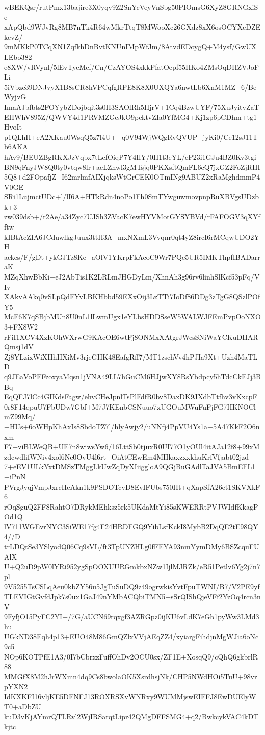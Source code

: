 wBEKQsr/rutPmx13bajire3X0yqv9Z2SnYcVeyVnSbg50PIOmsG6XyZ8GRNGxiSe
xApQbd9WJvRg8MB7nTk4R64wMkrTtqT8MWooXc26GXdz8xX6osOCYXcDZEkevZ/+
9mMKkP0TCqXN1ZqfkhDnBvtKNUnIMpWfJm/8AtvdEDoygQ+M4ysf/GwUXLEbo382
e8XW/vRVynl/5lEvTyeMcf/Cn/CzAYOS4xkkPfatOepf55HKo4ZMsOqDHZVJoFLi
5iVbzc39DNJvyX1B8sCR8hVPCqfgRPE8K8X0UXQYa6nwtLb6XnM1MZ+6/BeWyjvG
ImaAJbfbts2FOYybZDojbqit3s0H3SAOlRh5HjrV+1Cq4BzwUYF/75XuJyitvZaT
EIIWhV895Z/QWVY4d1PRVMZGcJkO9pcktvZIa0YfMG4+Kj1zp6pCDhm+tg1HvoIt
p1QLhH+eA2XKau0WsqQ5z7l4U++q0V94WjWQgRvQVUP+jyKi0/Ce12sJ11Tb6AKA
hAv9/BEUZBgRKXJzVqbx7tLefOiqP7Y4IlY/0H1t3eYL/eP23i1GJu4BZ0Kv3tgi
BN9qFnyJW8Q0ty0vtqw8lr+aeLZnwl3gMTsjq0PKXsftQmFL6cQ7jxGZ2FoZjRHI
5Q8+d2FOpafjZ+I62mrlmfAIXjqksWtGrCEK0OTmINg9ABUZ2xRaMghdmmP4V0GE
SRi1LujmctUDc+l/lI6A+HTkRdn4noPo1Fh0SmTYwguwmovpnpRuXBVgsUDzbk+3
zw039dsb+/r2Ae/a34Zyc7UJSh3ZVacK7ewHYVMotGYSYBVd/rFAFOGV3qXYfftw
kIBtAcZIA6JCduwlkgJuux3ttH3A+mxNXmL3Vvqnr0qt4yZ8ircI6rMCqwUDO2YH
ackcs/F/gDt+ykGJTz8Ke+aOlV1YKrpFkAcoC9Wr7PQe5UR5IMKThpfIBADarraK
MZqXhwBbKi+eJ2AbTis1K2LRLmJHGDyLm/XhnAh3g96rv6linhSlKcf53pFq/VIv
XAkvAAkq0vSLpQdFYvLBKHbbd59EXxOij3LzTTi7IoDf86DDg3zTgG8QSzlPOfY5
McF6K7qSBjbMUn8U0nL1lLwmUgx1eYLbsHDDSseW5WALWJFEmPvpOoNXO3+FX8W2
rFiI1XCV4XzKOhWXrwG9KAcOE6wtFj8ONMxXAtgrJWcsSNiWaYCKuDHARQmsj1dV
Zj8YLzixWiXHhHXiMv3rjeGHK48EafgRff7/MT1zschVv4hPJIa9Xt+Uzh4MaTLD
q9JEaVoPFFzoxyaMqsn1jVNA49LL7hGuCM6HJjwXY8RsYbdpcy5hTdcCkEJj3BBq
EqQFJ7lCc4GIKdsFagw/ehvCHeJpnlTsPlFdfR0bv8DaxDK9JXdbTtfhv3vKxcpF
0r8F14qpuU7FbUDw7Gbf+M7J7KEnbCSNuuo7xUGOuMWuFuFjFG7HKNOClmZ99Mq/
+HUs+6oWHpKhAxIs8SbdoTZ7l/hlyAwjy2/uNNfj4PpVU4Ys1a+5A47KkF2O6nxm
F7+viBLWeQB+UE7n8wiwsYw6/16LttSb0tjuxR0UI77O1yOUl4itAJa12f8+99xM
zdcwdlifWNiv4xol6Nc0OvU4l6rt+OiAtCEwEm4MHkaxzxxkhuKrfVfjabt02jzd
7+eEV1ULkYxtDMSzTMggLkUwZqDyXIiiggloA9QGjBuGAdlTaJVA5BmEFL1+iPnN
PVrgJyqjVmpJxrcHeAkn1k9PSDOTcvD8EvIFUbs750Ht+qXapSfA26et1SKVXkF6
rOqSguQ2FF8RahtO7DRykMEhksz5rk5UKdaMtYi85sKWERRtPVJWIdfKkagPOd1Q
lV711WGEvrNYC3SiWE17fg4F24HRDFGQ9YibLsfKckI8MybB2DqQE2tE98QY4//D
trLDQtSe3YSlyodQ06Cq9sVL/ft3TpUNZHLg0fFEYA93nmYymDMy6BSZcquFUAlX
U+Q2uD9pW0lYRi952ygSpOOXUURGmkbxNZw1IjlMJRZk/eR51Petlv6Yg2j7n7pl
9V5255TsCSLqAeu0kbZY56u5JgTuSuDQ9z49ogrwkisYvtFpuTWNI/B7/V2PE9yf
TLEVIGtGvfdJpk7s0ux1GaJ49nYMbACQbiTMN5+sSrQIShQjeVFf2YzOq4rcn3nV
9FyfjO15PyFC2YI+/7G/aUCN69rqxgf3AZRGpz0ijKU6vLdK7eGb1pyWw3LMd3hu
UGkND38Eqh4p13+EUO48M86GmQZlxVVjAEqZZ4/xyiargFihdjnMgWJia6oNc9c5
NOp6KOTPfE1A3/0I7bCbrxzFuffOhDv2OCU0sx/ZF1E+XosqQ9/cQhQ6gkbrlR88
MMGfX8M2hJrWXmn4dq9Cs8bwolaOK5XsrdhsjNk/CHP5NWdHOi5TuU+98vrpYXN2
IdKXKFI16vljKE5DFNFJ13ROXRSXvWNRxy9WUMMjswEIFFJ8EwDUElyWT0+aDbZU
kuD3vKjAYmrQTLRvl2WjIRSarqtLipr42QMgDFFSMG4+q2/BwkcykVAC4kDTkjtc
